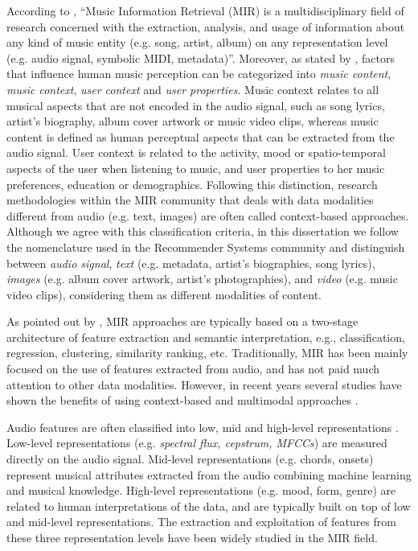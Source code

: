According to \citep{schedl2008}, ``Music Information Retrieval (MIR) is a multidisciplinary field of research concerned with the extraction, analysis, and usage of information about any kind of music entity (e.g. song, artist, album) on any representation level (e.g. audio signal, symbolic MIDI, metadata)''. Moreover, as stated by \cite{Schedl2013}, factors that influence human music perception can be categorized into \textit{music content}, \textit{music context}, \textit{user context} and \textit{user properties}. Music context relates to all musical aspects that are not encoded in the audio signal, such as song lyrics, artist's biography, album cover artwork or music video clips, whereas music content is defined as human perceptual aspects that can be extracted from the audio signal. User context is related to the activity, mood or spatio-temporal aspects of the user when listening to music, and user properties to her music preferences, education or demographics. Following this distinction, research methodologies within the MIR community that deals with data modalities different from audio (e.g. text, images) are often called context-based approaches. 
Although we agree with this classification criteria, in this dissertation we follow the nomenclature used in the Recommender Systems community \citep{Ostuni2013} and distinguish between \textit{audio signal}, \textit{text} (e.g. metadata, artist's biographies, song lyrics), \textit{images} (e.g. album cover artwork, artist's photographies), and \textit{video} (e.g. music video clips), considering them as different modalities of content.

As pointed out by \cite{humphrey2012}, MIR approaches are typically based on a two-stage architecture of feature extraction and semantic interpretation, e.g., classification, regression, clustering, similarity ranking, etc. 
Traditionally, MIR has been mainly focused on the use of features extracted from audio, and has not paid much attention to other data modalities. However, in recent years several studies have shown the benefits of using context-based and multimodal approaches \citep{Schedl2014}. 

Audio features are often classified into low, mid and high-level representations \citep{bello2015}. Low-level representations (e.g. \textit{spectral flux, cepstrum, MFCCs}) are measured directly on the audio signal. Mid-level representations (e.g. chords, onsets) represent musical attributes extracted from the audio combining machine learning and musical knowledge. High-level representations (e.g. mood, form, genre) are related to human interpretations of the data, and are typically built on top of low and mid-level representations. The extraction and exploitation of features from these three representation levels have been widely studied in the MIR field. 

